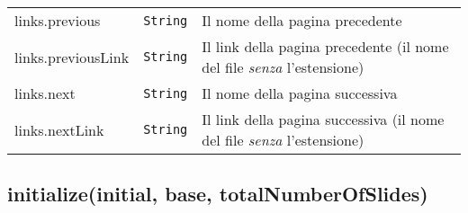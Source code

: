 \begin{tabularx}{\textwidth}{XXX}
\begin{minipage}[t]{0.30\columnwidth}
links.previous\strut
\end{minipage} & \begin{minipage}[t]{0.30\columnwidth}\raggedright
\texttt{String}\strut
\end{minipage} & \begin{minipage}[t]{0.30\columnwidth}\raggedright
Il nome della pagina precedente\strut
\end{minipage}\tabularnewline
\begin{minipage}[t]{0.30\columnwidth}\raggedright
links.previousLink\strut
\end{minipage} & \begin{minipage}[t]{0.30\columnwidth}\raggedright
\texttt{String}\strut
\end{minipage} & \begin{minipage}[t]{0.30\columnwidth}\raggedright
Il link della pagina precedente (il nome del file \emph{senza}
l'estensione)\strut
\end{minipage}\tabularnewline
\begin{minipage}[t]{0.30\columnwidth}\raggedright
links.next\strut
\end{minipage} & \begin{minipage}[t]{0.30\columnwidth}\raggedright
\texttt{String}\strut
\end{minipage} & \begin{minipage}[t]{0.30\columnwidth}\raggedright
Il nome della pagina successiva\strut
\end{minipage}\tabularnewline
\begin{minipage}[t]{0.30\columnwidth}\raggedright
links.nextLink\strut
\end{minipage} & \begin{minipage}[t]{0.30\columnwidth}\raggedright
\texttt{String}\strut
\end{minipage} & \begin{minipage}[t]{0.30\columnwidth}\raggedright
Il link della pagina successiva (il nome del file \emph{senza}
l'estensione)\strut
\end{minipage}\tabularnewline
\bottomrule
\end{tabularx}

\protect\hypertarget{initialize}{}{}

\hypertarget{initializeinitial-base-totalnumberofslides}{%
\subsection{initialize(initial, base,
totalNumberOfSlides)}\label{initializeinitial-base-totalnumberofslides}}

